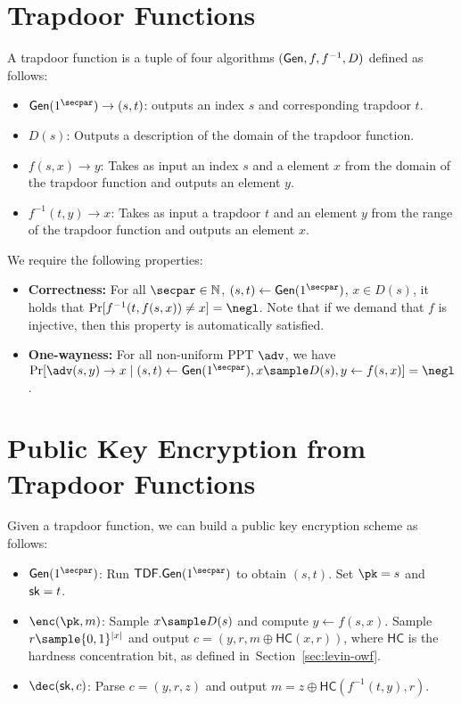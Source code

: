 \section{Trapdoor Functions}
\begin{definition}
    A trapdoor function is a tuple of four algorithms $(\mathsf{Gen}, f, f^{-1}, D)$ defined as follows:
    \begin{itemize}
        \item $\gen(1^\secpar) \to (s,t)$: outputs an index $s$ and corresponding trapdoor $t$.
        \item $D(s)$: Outputs a description of the domain of the trapdoor function.
        \item $f(s, x) \to y$: Takes as input an index $s$ and a element $x$ from the domain of the trapdoor function and outputs an element $y$.
        \item $f^{-1}(t, y) \to x$: Takes as input a trapdoor $t$ and an element $y$ from the range of the trapdoor function and outputs an element $x$.
    \end{itemize}
    We require the following properties:
    \begin{itemize}
        \item \textbf{Correctness:} For all $\secpar \in \mathbb{N}$, $(s,t) \gets \gen(1^\secpar)$, $x \in D(s)$, it holds that $\Pr[f^{-1}(t, f(s, x)) \neq x] = \negl$. Note that if we demand that $f$ is injective, then this property is automatically satisfied.
        \item \textbf{One-wayness:} For all non-uniform PPT $\adv$, we have $\Pr[\adv(s, y) \to x \mid (s,t) \gets \gen(1^\secpar), x \sample D(s), y \gets f(s, x)] = \negl$.
    \end{itemize}
\end{definition}

\section{Public Key Encryption from Trapdoor Functions}
Given a trapdoor function, we can build a public key encryption scheme as follows:
\begin{itemize}
    \item $\gen(1^\secpar)$: Run $\mathsf{TDF}.\gen(1^\secpar)$ to obtain $(s,t)$. Set $\pk = s$ and $\mathsf{sk} = t$.
    \item $\enc(\pk, m)$: Sample $x \sample D(s)$ and compute $y \gets f(s, x)$. Sample $r \sample \{0,1\}^{|x|}$ and output $c = (y, r, m \oplus \mathsf{HC}(x,r))$, where $\mathsf{HC}$ is the hardness concentration bit, as defined in~Section~\ref{sec:levin-owf}.
    \item $\dec(\sk, c)$: Parse $c = (y, r, z)$ and output $m = z \oplus \mathsf{HC}(f^{-1}(t, y), r)$.
\end{itemize}

